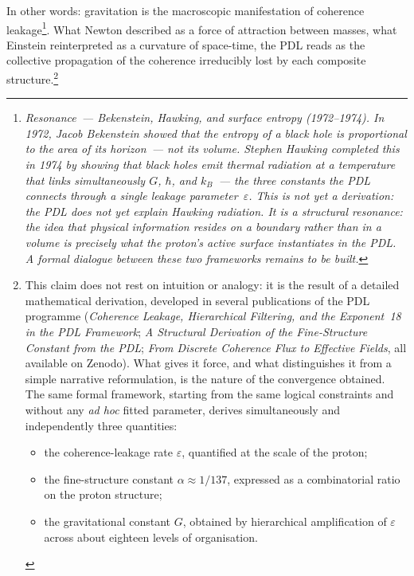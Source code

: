 \documentclass[12pt, a4paper, openright]{book}
\begin{document}
In other words: gravitation is the macroscopic manifestation of coherence leakage\footnote{\textit{Resonance~--- Bekenstein, Hawking, and surface entropy (1972--1974). In 1972, Jacob Bekenstein showed that the entropy of a black hole is proportional to the area of its horizon~--- not its volume. Stephen Hawking completed this in 1974 by showing that black holes emit thermal radiation at a temperature that links simultaneously $G$, $\hbar$, and $k_B$~--- the three constants the PDL connects through a single leakage parameter~$\varepsilon$. This is not yet a derivation: the PDL does not yet explain Hawking radiation. It is a structural resonance: the idea that physical information resides on a boundary rather than in a volume is precisely what the proton's active surface instantiates in the PDL\@. A formal dialogue between these two frameworks remains to be built.}}. What Newton described as a force of attraction between masses, what Einstein reinterpreted as a curvature of space-time, the PDL reads as the collective propagation of the coherence irreducibly lost by each composite structure.\footnote{%
  This claim does not rest on intuition or analogy: it is the result of a detailed mathematical derivation, developed in several publications of the PDL programme (\textit{Coherence Leakage, Hierarchical Filtering, and the Exponent~18 in the PDL Framework}; \textit{A Structural Derivation of the Fine-Structure Constant from the PDL}; \textit{From Discrete Coherence Flux to Effective Fields}, all available on Zenodo). What gives it force, and what distinguishes it from a simple narrative reformulation, is the nature of the convergence obtained. The same formal framework, starting from the same logical constraints and without any \emph{ad hoc} fitted parameter, derives simultaneously and independently three quantities:
  \begin{itemize}
  \item the coherence-leakage rate $\varepsilon$, quantified at the scale of the proton;
  \item the fine-structure constant $\alpha \approx 1/137$, expressed as a combinatorial ratio on the proton structure;
  \item the gravitational constant $G$, obtained by hierarchical amplification of $\varepsilon$ across about eighteen levels of organisation.
  \end{itemize}
}
\end{document}
